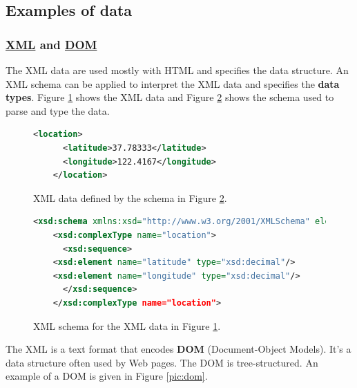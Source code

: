 \subsection{Examples of data}

\subsubsection{\href{https://en.wikipedia.org/wiki/XML}{XML} and \href{https://en.wikipedia.org/wiki/Document\_Object\_Model}{DOM}}

The XML data are used mostly with HTML and specifies the data structure. An XML schema can be applied to interpret the XML data and specifies the {\bf data types}. Figure \ref{fig:xml_data} shows the XML data and Figure \ref{fig:xml_schema} shows the schema used to parse and type the data.

\begin{figure}[H]%
 \centering
  \begin{lstlisting}[language=XML]
    <location>
      <latitude>37.78333</latitude>
      <longitude>122.4167</longitude>
    </location>
  \end{lstlisting}
 \caption{\label{fig:xml_data} XML data defined by the schema in Figure \ref{fig:xml_schema}.}
\end{figure}

\begin{figure}[H]%
 \centering
  \begin{lstlisting}[language=XML]
    <xsd:schema xmlns:xsd="http://www.w3.org/2001/XMLSchema" elementFormDefault="unqualified">
    <xsd:complexType name="location">
      <xsd:sequence>
	<xsd:element name="latitude" type="xsd:decimal"/>
	<xsd:element name="longitude" type="xsd:decimal"/>
      </xsd:sequence>
    </xsd:complexType name="location">
  \end{lstlisting}
 \caption{\label{fig:xml_schema} XML schema for the XML data in Figure \ref{fig:xml_data}.}
\end{figure}

The XML is a text format that encodes {\bf DOM} (Document-Object Models). It's a data structure often used by Web pages. The DOM is tree-structured. An example of a DOM is given in Figure \ref{pic:dom}.

